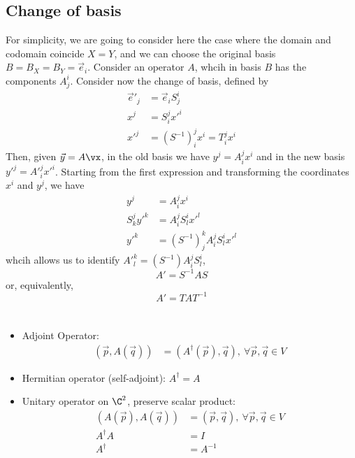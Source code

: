 \documentclass[cplx.tex]{subfiles}
\begin{document}
\section{Change of basis}
For simplicity, we are going to consider here the case where the domain and codomain coincide $X=Y$, and we can choose the original basis $B = B_X = B_Y = \vec{e}_i$.
Consider an operator $A$, whcih in basis $B$ has the components $A^i_j$.
Consider now the change of basis, defined by
\begin{align}
    \vec{e}'_j &= \vec{e}_iS^i_j \\
    x^j &= S_i^jx'^i \\
    x'^j &= \left(S^{-1}\right)_i^jx^i = T_i^jx^i
\end{align}
Then, given $\vec{y} = A\vx$, in the old basis we have $y^j = A^j_ix^i$ and in the new basis $y'^j = A'^j_ix'^i$.
Starting from the first expression and transforming the coordinates $x^i$ and $y^j$, we have
\begin{align}
    y^j &= A_i^jx^i \\
    S_k^jy'^k &= A_i^jS_l^ix'^l \\
    y'^k &= \left(S^{-1}\right)_j^kA_i^jS_l^ix'^l 
\end{align}
whcih allows us to identify $A'^k_l = \left(S^{-1}\right)A_i^jS_l^i$, 
\begin{equation}
    A' = S^{-1}AS
\end{equation}
or, equivalently,
\begin{equation}
    A' = TAT^{-1}
\end{equation}

\chapter{}
\begin{itemize}
    \item Adjoint Operator:
        \begin{align}
            (\vec{p},A(\vec{q})) &= (A^\dagger(\vec{p}),\vec{q}),~ \forall \vec{p},\vec{q} \in V
        \end{align}
        
    \item Hermitian operator (self-adjoint): $A^\dagger = A$
    \item Unitary operator on $\C^2$, preserve scalar product:
        \begin{align}
            (A(\vec{p}),A(\vec{q})) &= (\vec{p},\vec{q}),~ \forall \vec{p},\vec{q} \in V \\
            A^\dagger A &= I \\
            A^\dagger &= A^{-1}
        \end{align}
\end{itemize}
\end{document}
